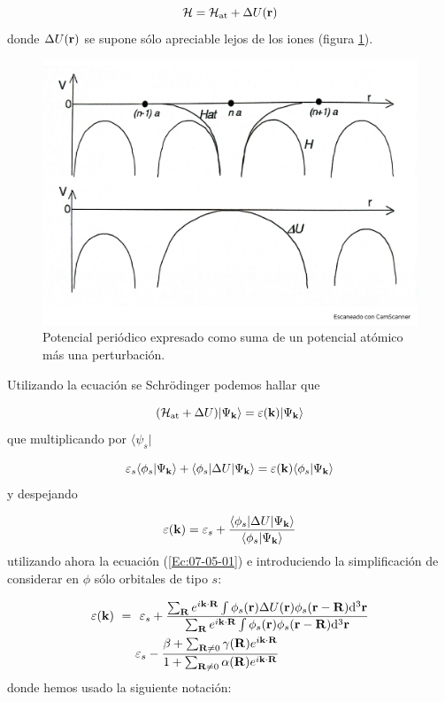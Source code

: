 \begin{equation}
	\mathcal{H} = \mathcal{H}_{\text{at}} + \Delta U(\mathbf{r})
\end{equation} 
donde $\Delta U (\mathbf{r})$ se supone sólo apreciable lejos de los iones (figura \ref{Fig:07-05}).

\begin{figure}[h!] \centering
	\includegraphics[scale=0.3]{Cuerpo/Ch_07/Fotos libro 5.pdf}
	\caption{Potencial periódico expresado como suma de un potencial atómico más una perturbación.}
	\label{Fig:07-05}
\end{figure}    
Utilizando la ecuación se Schrödinger podemos hallar que

\begin{equation}
	(\mathcal{H}_\text{at} + \Delta U) |\Psi_{\mathbf{k}} \rangle = \varepsilon(\mathbf{k}) |\Psi_{\mathbf{k}} \rangle
\end{equation}
que multiplicando por $\langle \psi_s |$   

\begin{equation}
	\varepsilon_s \langle \phi_s |\Psi_{\mathbf{k}} \rangle + \langle \phi_s | \Delta U |\Psi_{\mathbf{k}} \rangle = \varepsilon(\mathbf{k}) \langle \phi_s |\Psi_{\mathbf{k}} \rangle
\end{equation}
y despejando 

\begin{equation}
	\varepsilon(\mathbf{k}) = \varepsilon_s + \frac{\langle \phi_s |\Delta U | \Psi_{\mathbf{k}} \rangle}{\langle \phi_s |\Psi_{\mathbf{k}} \rangle}
\end{equation}
utilizando ahora la ecuación (\ref{Ec:07-05-01}) e introduciendo la simplificación de considerar en $\phi$ sólo orbitales de tipo $s$:

\begin{equation}
	\begin{split}
		\varepsilon (\mathbf{k}) \ = \ & \ \varepsilon_s  + \frac{\sum_{\mathbf{R}} e^{i \mathbf{k} \cdot \mathbf{R} }\int \phi_s (\mathbf{r}) \Delta U (\mathbf{r}) \phi_s (\mathbf{r} - \mathbf{R}) \mathrm{d}^3 \mathbf{r} }{\sum_{\mathbf{R}} e^{i \mathbf{k} \cdot \mathbf{R} }\int \phi_s (\mathbf{r})\phi_s (\mathbf{r} - \mathbf{R}) \mathrm{d}^3 \mathbf{r} }\\
		& \varepsilon_s -  \frac{\beta + \sum_{\mathbf{R}\neq 0} \gamma(\mathbf{R}) e^{i\mathbf{k} \cdot \mathbf{R}}}{1+\sum_{\mathbf{R}\neq 0} \alpha (\mathbf{R}) e^{i\mathbf{k} \cdot \mathbf{R}}}
	\end{split}
\end{equation}
donde hemos usado la siguiente notación: 

